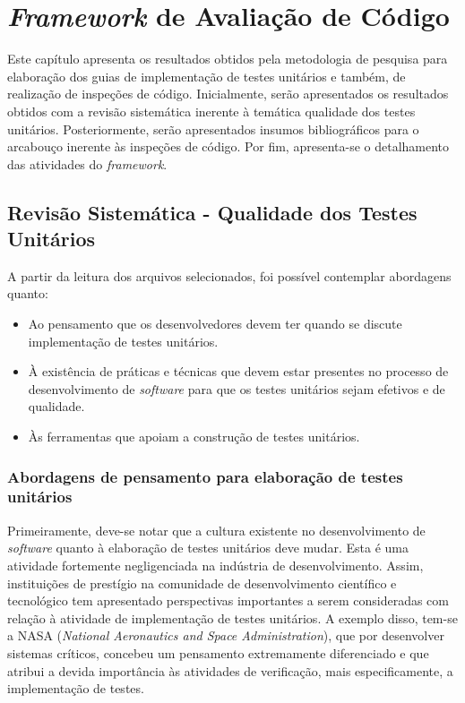 \chapter{\textit{Framework} de Avaliação de Código}

Este capítulo apresenta os resultados obtidos pela metodologia de pesquisa para elaboração dos guias de implementação de testes unitários e também, de realização de inspeções de código. Inicialmente, serão apresentados os resultados obtidos com a revisão sistemática inerente à temática qualidade dos testes unitários. Posteriormente, serão apresentados insumos bibliográficos para o arcabouço inerente às inspeções de código. Por fim, apresenta-se o detalhamento das atividades do \textit{framework}.

\section{Revisão Sistemática - Qualidade dos Testes Unitários}

A partir da leitura dos arquivos selecionados, foi possível contemplar abordagens quanto:

\begin{itemize}
	\item Ao pensamento que os desenvolvedores devem ter quando se discute implementação de testes unitários.
	\item À existência de práticas e técnicas que devem estar presentes no processo de desenvolvimento de \textit{software} para que os testes unitários sejam efetivos e de qualidade.
	\item Às ferramentas que apoiam a construção de testes unitários.
\end{itemize}

\subsection{Abordagens de pensamento para elaboração de testes unitários}

Primeiramente, deve-se notar que a cultura existente no desenvolvimento de \textit{software} quanto à elaboração de testes unitários deve mudar. Esta é uma atividade fortemente negligenciada na indústria de desenvolvimento. Assim, instituições de prestígio na comunidade de desenvolvimento científico e tecnológico tem apresentado perspectivas importantes a serem consideradas com relação à atividade de implementação de testes unitários. A exemplo disso, tem-se a NASA (\textit{National Aeronautics and Space Administration}), que por desenvolver sistemas críticos, concebeu um pensamento extremamente diferenciado e que atribui a devida importância às atividades de verificação, mais especificamente, a implementação de testes.

